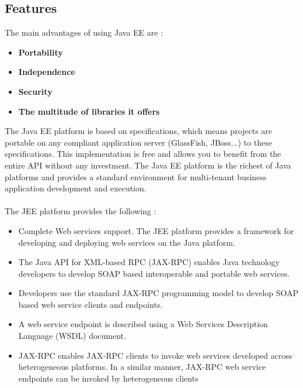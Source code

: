 \documentclass[12pt]{article}
\begin{document}
\subsection{Features}
The main advantages of using Java EE are :
\begin{itemize}
	\item \textbf{Portability}
	\item \textbf{Independence}
	\item \textbf{Security}
	\item \textbf{The multitude of libraries it offers}
\end{itemize}
The Java EE platform is based on specifications, which means projects are portable on any compliant application server (GlassFish, JBoss...) to these specifications. This implementation is free and allows you to benefit from the entire API without any investment. The Java EE platform is the richest of Java platforms and provides a standard environment for multi-tenant business application development and execution. 
\\
\\
The JEE platform provides the following :
\begin{itemize}
	\item Complete Web services support. The JEE platform provides a framework for developing and deploying web services on the Java platform. 
	\item The Java API for XML-based RPC (JAX-RPC) enables Java technology developers to develop SOAP based interoperable and portable web services.
	\item Developers use the standard JAX-RPC programming model to develop SOAP based web service clients and endpoints.
	\item A web service endpoint is described using a Web Services Description Language (WSDL) document.
	\item JAX-RPC enables JAX-RPC clients to invoke web services developed across heterogeneous platforms. In a similar manner, JAX-RPC web service endpoints can be invoked by heterogeneous clients
\end{itemize}
\end{document}
